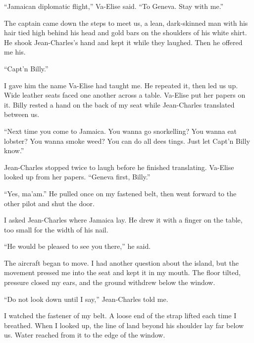 ``Jamaican diplomatic flight,'' Va-Elise said. ``To Geneva. Stay with me.''\par

The captain came down the steps to meet us, a lean, dark-skinned man with his hair tied high behind his head and gold bars on the shoulders of his white shirt. He shook Jean-Charles's hand and kept it while they laughed. Then he offered me his.\par

``Capt'n Billy.''\par

I gave him the name Va-Elise had taught me. He repeated it, then led us up. Wide leather seats faced one another across a table. Va-Elise put her papers on it. Billy rested a hand on the back of my seat while Jean-Charles translated between us.\par

``Next time you come to Jamaica. You wanna go snorkelling? You wanna eat lobster? You wanna smoke weed? You can do all dees tings. Just let Capt'n Billy know.''\par

Jean-Charles stopped twice to laugh before he finished translating. Va-Elise looked up from her papers. ``Geneva first, Billy.''\par

``Yes, ma'am.'' He pulled once on my fastened belt, then went forward to the other pilot and shut the door.\par

I asked Jean-Charles where Jamaica lay. He drew it with a finger on the table, too small for the width of his nail.\par

``He would be pleased to see you there,'' he said.\par

The aircraft began to move. I had another question about the island, but the movement pressed me into the seat and kept it in my mouth. The floor tilted, pressure closed my ears, and the ground withdrew below the window.\par

``Do not look down until I say,'' Jean-Charles told me.\par

I watched the fastener of my belt. A loose end of the strap lifted each time I breathed. When I looked up, the line of land beyond his shoulder lay far below us. Water reached from it to the edge of the window.\par

